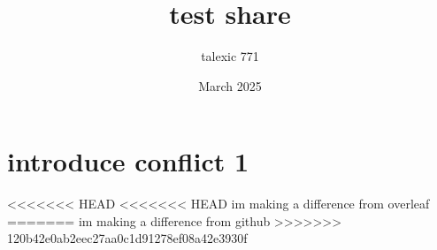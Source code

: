 \documentclass{article}
\title{test share}
\author{talexic 771 }
\date{March 2025}
\begin{document}
\maketitle

\section{introduce conflict 1}
<<<<<<< HEAD
<<<<<<< HEAD
im making a difference from overleaf
=======
im making a difference from github
>>>>>>> 120b42e0ab2eec27aa0c1d91278ef08a42e3930f
\end{document}
